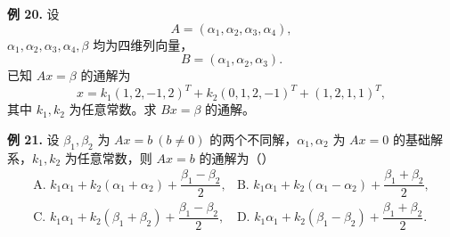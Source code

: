 \begin{problemblock}
\textbf{例 20.} 设
\[
A=(\alpha_1,\alpha_2,\alpha_3,\alpha_4),
\]
\(\alpha_1,\alpha_2,\alpha_3,\alpha_4,\beta\) 均为四维列向量，
\[
B=(\alpha_1,\alpha_2,\alpha_3).
\]
已知 \(Ax=\beta\) 的通解为
\[
x=k_1(1,2,-1,2)^T+k_2(0,1,2,-1)^T+(1,2,1,1)^T,
\]
其中 \(k_1,k_2\) 为任意常数。求 \(Bx=\beta\) 的通解。
\end{problemblock}
\begin{solutionblock}
\answer{\[
x=(1,3,3)^T+t(1,4,3)^T,\qquad t\in\mathbb R.
\]}
\end{solutionblock}

\begin{problemblock}
\textbf{例 21.} 设 \(\beta_1,\beta_2\) 为 \(Ax=b\ (b\ne0)\) 的两个不同解，\(\alpha_1,\alpha_2\) 为 \(Ax=0\) 的基础解系，\(k_1,k_2\) 为任意常数，则 \(Ax=b\) 的通解为（\quad）
\[
\begin{array}{ll}
\text{A. }k_1\alpha_1+k_2(\alpha_1+\alpha_2)+\dfrac{\beta_1-\beta_2}{2},&
\text{B. }k_1\alpha_1+k_2(\alpha_1-\alpha_2)+\dfrac{\beta_1+\beta_2}{2},\\[6pt]
\text{C. }k_1\alpha_1+k_2(\beta_1+\beta_2)+\dfrac{\beta_1-\beta_2}{2},&
\text{D. }k_1\alpha_1+k_2(\beta_1-\beta_2)+\dfrac{\beta_1+\beta_2}{2}.
\end{array}
\]
\end{problemblock}
\begin{solutionblock}
\end{solutionblock}

